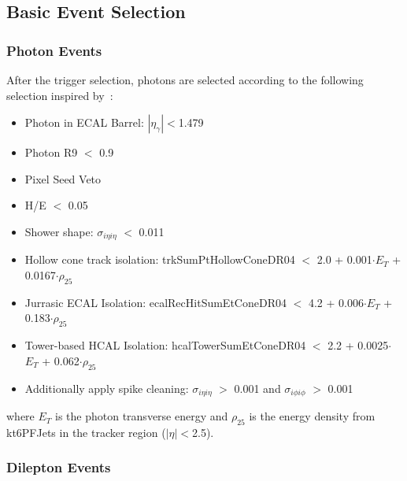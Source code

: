 \clearpage

\subsection{Basic Event Selection}

\subsubsection{Photon Events}

After the trigger selection, photons are selected according to the following selection inspired by~\cite{ref:vgamma}:
\begin{itemize}
\item Photon in ECAL Barrel: $|\eta_\gamma|$$<$1.479
\item Photon R9 $<$ 0.9
\item Pixel Seed Veto
\item H/E $<$ 0.05
\item Shower shape: $\sigma_{i\eta i\eta}$ $<$ 0.011
\item Hollow cone track isolation: trkSumPtHollowConeDR04 $<$ 2.0 + 0.001$\cdot$$E_T$ + 0.0167$\cdot$$\rho_{25}$
\item Jurrasic ECAL Isolation: ecalRecHitSumEtConeDR04 $<$ 4.2 + 0.006$\cdot$$E_T$ + 0.183$\cdot$$\rho_{25}$
\item Tower-based HCAL Isolation: hcalTowerSumEtConeDR04 $<$ 2.2 + 0.0025$\cdot$$E_T$ + 0.062$\cdot$$\rho_{25}$
\item Additionally apply spike cleaning: $\sigma_{i\eta i\eta}$ $>$ 0.001 and $\sigma_{i\phi i\phi}$ $>$ 0.001
\end{itemize}
where $E_T$ is the photon transverse energy and $\rho_{25}$ is the energy density from kt6PFJets in the tracker region ($|\eta|$$<$2.5).

\subsubsection{Dilepton Events}

